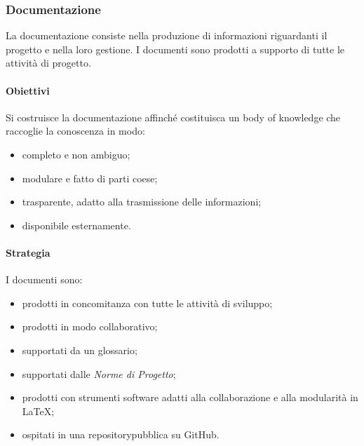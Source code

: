 	\subsubsection{Documentazione}
	La documentazione consiste nella produzione di informazioni riguardanti il progetto e nella loro gestione. I documenti sono prodotti a supporto di tutte le attività di progetto.
		\paragraph{Obiettivi}
			Si costruisce la documentazione affinché costituisca un body of knowledge\glosp %
			che raccoglie la conoscenza in modo:
			\begin{itemize}
				\item completo e non ambiguo;
				\item modulare e fatto di parti coese;
				\item trasparente, adatto alla trasmissione delle informazioni;
				\item disponibile esternamente.
			\end{itemize}
		\paragraph{Strategia}
		I documenti sono:
		\begin{itemize}
			\item prodotti in concomitanza con tutte le attività di sviluppo;
			\item prodotti in modo collaborativo;
			\item supportati da un glossario;
			\item supportati dalle \textit{Norme di Progetto};
			\item prodotti con strumenti software adatti alla collaborazione e alla modularità in \LaTeX{};
			\item ospitati in una repository\glosp pubblica su GitHub\glo.
		\end{itemize}
